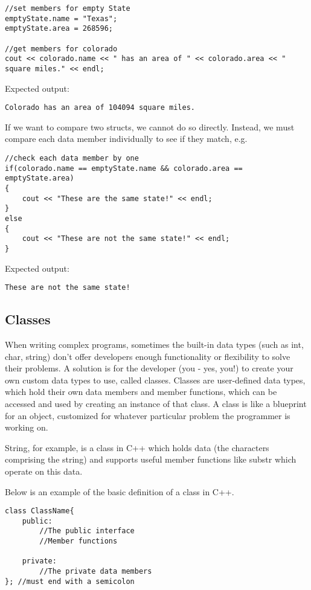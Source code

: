 \begin{verbatim}
//set members for empty State
emptyState.name = "Texas";
emptyState.area = 268596;

//get members for colorado
cout << colorado.name << " has an area of " << colorado.area << " square miles." << endl;
\end{verbatim}

Expected output:

\begin{verbatim}
Colorado has an area of 104094 square miles.
\end{verbatim}

If we want to compare two structs, we cannot do so directly. Instead, we must compare each data member individually to see if they match, e.g.

\begin{verbatim}
//check each data member by one
if(colorado.name == emptyState.name && colorado.area == emptyState.area)
{
    cout << "These are the same state!" << endl;
}
else
{
    cout << "These are not the same state!" << endl;
}
\end{verbatim}

Expected output:

\begin{verbatim}
These are not the same state!
\end{verbatim}

\subsection{Classes}
When writing complex programs, sometimes the built-in data types (such as int, char, string) don’t offer developers enough functionality or flexibility to solve their problems. A solution is for the developer (you - yes, you!) to create your own custom data types to use, called classes. Classes are user-defined data types, which hold their own data members and member functions, which can be accessed and used by creating an instance of that class. A class is like a blueprint for an object, customized for whatever particular problem the programmer is working on.

String, for example, is a class in C++ which holds data (the characters comprising the string) and supports useful member functions like substr which operate on this data.

Below is an example of the basic definition of a class in C++.

\begin{verbatim}
class ClassName{
    public:
        //The public interface
        //Member functions

    private:
        //The private data members
}; //must end with a semicolon
\end{verbatim}

